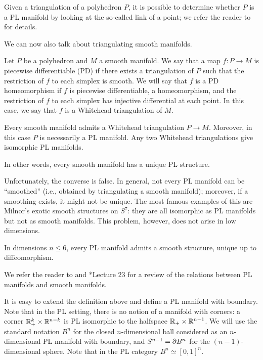 Given a triangulation of a polyhedron $P$, it is possible to determine whether
$P$ is a PL manifold by looking at the so-called link of a point; we refer the
reader to  for details.

We can now also talk about triangulating smooth manifolds.

\begin{definition}\label{d:whitehead-triangulation}
Let $P$ be a polyhedron and $M$ a smooth manifold. We say that a map $f\colon
P\to M$ is piecewise differentiable (PD) if there exists a triangulation of $P$
such that the restriction of $f$ to each simplex is smooth. We will say that $f$
is a PD homeomorphism if $f$ is piecewise differentiable, a homeomorphism, and
the restriction of $f$ to each simplex has injective differential at each point.
In this case, we say that $f$ is a Whitehead triangulation of $M$.
\end{definition}

\begin{theorem}\label{t:whitehead}
  Every smooth manifold admits a Whitehead triangulation $P \to M$. Moreover, in
  this case $P$ is necessarily a PL manifold. Any two Whitehead triangulations
  give isomorphic PL manifolds.
\end{theorem}

In other words, every smooth manifold has a unique PL structure.

Unfortunately, the converse is false. In general, not every PL manifold can be
``smoothed'' (i.e., obtained by triangulating a smooth manifold); moreover, if
a smoothing exists, it might not be unique. The most famous examples of this are
Milnor's exotic smooth structures on $S^7$: they are all isomorphic as PL
manifolds but not as smooth manifolds. This problem,
however, does not arise in low dimensions.

\begin{theorem}\label{t:PL-smooth}
    In dimensions $n\le 6$, every PL manifold admits a smooth structure,
    unique up to diffeomorphism.
\end{theorem}
We refer the reader to  and *{Lecture 23}
for a review of the relations between PL manifolds and smooth manifolds.



It is easy to extend the definition above and define a PL manifold with
boundary. Note that in the PL setting, there is no notion of a manifold with
corners: a corner $\mathbb{R}_+^k \times \mathbb{R}^{n-k}$ is PL isomorphic to the halfspace
$\mathbb{R}_+\times \mathbb{R}^{n-1}$. We will use the standard notation $B^n$ for the closed
$n$-dimensional ball considered as an $n$-dimensional PL manifold with boundary,
and $S^{n-1}=\partial B^n$ for the $(n-1)$-dimensional sphere. Note that in the PL
category $B^n\simeq [0,1]^n$.

